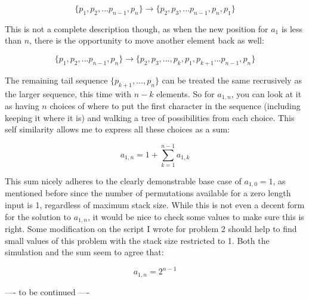 \documentclass{article}
\begin{document}
\begin{equation*}
  \{ p_1,p_2,...p_{n-1},p_{n} \}
  \rightarrow
  \{ p_2,p_3,...p_{n-1},p_{n},p_{1} \}
\end{equation*}

This is not a complete description though, as when the new position for $a_1$ is less than $n$, there is the opportunity to move another element back as well:

\begin{equation*}
  \{ p_1,p_2,...p_{n-1},p_{n} \}
  \rightarrow
  \{ p_2,p_3,...,p_k,p_1,p_{k+1}...p_{n-1},p_{n} \}
\end{equation*}

The remaining tail sequence $\{p_{k+1},...,p_n\}$ can be treated the same recrusively as the larger sequence, this time with $n - k$ elements. So for $a_{1,n}$, you can look at it as having $n$ choices of where to put the first character in the sequence (including keeping it where it is) and walking a tree of possibilities from each choice.  This self similarity allows me to express all these choices as a sum:

\begin{equation}
  a_{1,n} = 1 + \sum_{k=1}^{n-1} a_{1,k}
\end{equation}

This sum nicely adheres to the clearly demonstrable base case of $a_{1,0} = 1$, as mentioned before since the number of permutations available for a zero length input is 1, regardless of maximum stack size.  While this is not even a decent form for the solution to $a_{1,n}$, it would be nice to check some values to make sure this is right.  Some modification on the script I wrote for problem 2 should help to find small values of this problem with the stack size restricted to 1.  Both the simulation and the sum seem to agree that:

\begin{equation*}
  a_{1,n} = 2^{n -1}
\end{equation*}

\par

---- to be continued ----
\end{document}
